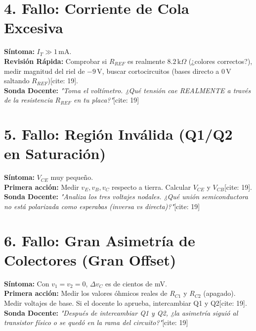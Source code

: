 \documentclass[11pt, a4paper]{article}
\begin{document}
\section*{4. Fallo: Corriente de Cola Excesiva}
\textbf{Síntoma:} $I_T \gg 1\,\text{mA}$. \\
\textbf{Revisión Rápida:} Comprobar si $R_{REF}$ es realmente $8.2\,\text{k}\Omega$ (¿colores correctos?), medir magnitud del riel de $-9\,\text{V}$, buscar cortocircuitos (bases directo a $0\,\text{V}$ saltando $R_{REF}$)[cite: 19]. \\
\textbf{Sonda Docente:} \textit{"Toma el voltímetro. ¿Qué tensión cae REALMENTE a través de la resistencia $R_{REF}$ en tu placa?"}[cite: 19]

\section*{5. Fallo: Región Inválida (Q1/Q2 en Saturación)}
\textbf{Síntoma:} $V_{CE}$ muy pequeño. \\
\textbf{Primera acción:} Medir $v_E, v_B, v_C$ respecto a tierra. Calcular $V_{CE}$ y $V_{CB}$[cite: 19]. \\
\textbf{Sonda Docente:} \textit{"Analiza los tres voltajes nodales. ¿Qué unión semiconductora no está polarizada como esperabas (inversa vs directa)?"}[cite: 19]

\section*{6. Fallo: Gran Asimetría de Colectores (Gran Offset)}
\textbf{Síntoma:} Con $v_1=v_2=0$, $\Delta v_C$ es de cientos de mV. \\
\textbf{Primera acción:} Medir los valores óhmicos reales de $R_{C1}$ y $R_{C2}$ (apagado). Medir voltajes de base. Si el docente lo aprueba, intercambiar Q1 y Q2[cite: 19]. \\
\textbf{Sonda Docente:} \textit{"Después de intercambiar Q1 y Q2, ¿la asimetría siguió al transistor físico o se quedó en la rama del circuito?"}[cite: 19]
\end{document}
